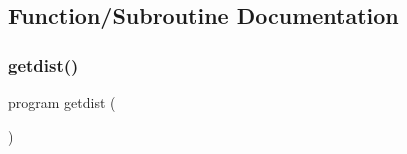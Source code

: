 \subsection{Function/\+Subroutine Documentation}
\mbox{\label{GetDist_8f90_a78c185cfd3ac27937ede022b24ae72e9}} 
\subsubsection{\texorpdfstring{getdist()}{getdist()}}
{\footnotesize\ttfamily program getdist (\begin{DoxyParamCaption}{ }\end{DoxyParamCaption})}



